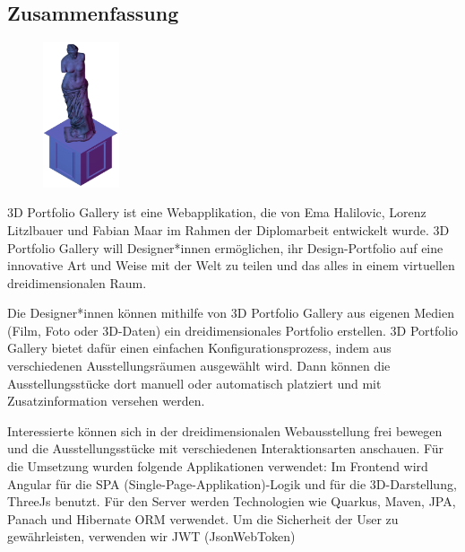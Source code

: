 \newpage
\begin{spacing}{1}
    \chapter*{Zusammenfassung}
\end{spacing}
\begin{figure}
    \begin{center}
      \includegraphics[width=0.2\textwidth]{pics/statue.png}
    \end{center}
\end{figure}
3D Portfolio Gallery ist eine Webapplikation, die von Ema Halilovic, Lorenz Litzlbauer und Fabian Maar im Rahmen der Diplomarbeit entwickelt wurde. 3D Portfolio Gallery will Designer*innen ermöglichen, ihr Design-Portfolio auf eine innovative Art und Weise mit der Welt zu teilen und das alles in einem virtuellen dreidimensionalen Raum. 

Die Designer*innen können mithilfe von 3D Portfolio Gallery aus eigenen Medien (Film, Foto oder 3D-Daten) ein dreidimensionales Portfolio erstellen. 3D Portfolio Gallery bietet dafür einen einfachen Konfigurationsprozess, indem aus verschiedenen Ausstellungsräumen ausgewählt wird. Dann können die Ausstellungsstücke dort manuell oder automatisch platziert und mit Zusatzinformation versehen werden.

Interessierte können sich in der dreidimensionalen Webausstellung frei bewegen und die Ausstellungsstücke mit verschiedenen Interaktionsarten anschauen.
Für die Umsetzung wurden folgende Applikationen verwendet: Im Frontend wird Angular für die SPA (Single-Page-Applikation)-Logik und für die 3D-Darstellung, ThreeJs benutzt. Für den Server werden Technologien wie Quarkus, Maven, JPA, Panach und  Hibernate ORM verwendet. Um die Sicherheit der User zu gewährleisten, verwenden wir JWT (JsonWebToken)
